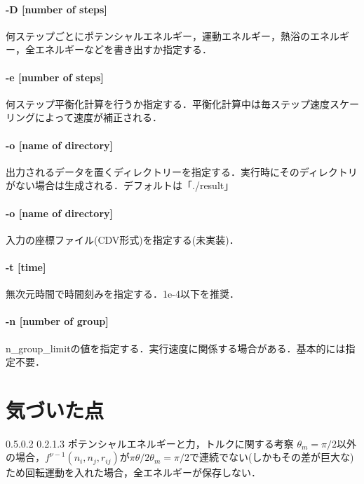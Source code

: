 \documentclass[11pt,a4j,titlepage,oneside,openright]{jsbook}
\makeatletter
\renewcommand{\section}{%
   \@startsection{section}{1}{\z@}%
   {0.5\Cvs \@plus.0\Cdp \@minus.2\Cdp}%
   {0.2\Cvs \@plus.1\Cdp \@minus.3\Cdp}%
   {\reset@font\large\bfseries}}%
\makeatother
\begin{document}
   \subsubsection{-D [number of steps]}
   何ステップごとにポテンシャルエネルギー，運動エネルギー，熱浴のエネルギー，全エネルギーなどを書き出すか指定する．
   \subsubsection{-e [number of steps]}
   何ステップ平衡化計算を行うか指定する．平衡化計算中は毎ステップ速度スケーリングによって速度が補正される．
   \subsubsection{-o [name of directory]}
   出力されるデータを置くディレクトリーを指定する．実行時にそのディレクトリがない場合は生成される．デフォルトは「./result」
   \subsubsection{-o [name of directory]}
   入力の座標ファイル(CDV形式)を指定する(未実装)．
   \subsubsection{-t [time]}
   無次元時間で時間刻みを指定する．1e-4以下を推奨．
   \subsubsection{-n [number of group]}
   n\_group\_limitの値を指定する．実行速度に関係する場合がある．基本的には指定不要．

\chapter{気づいた点}

 \section{ポテンシャルエネルギーと力，トルクに関する考察}
 $\theta_m = \pi/2$以外の場合，$f^{\nu-1}(n_i,n_j,r_{ij})$が$\pi\theta/2\theta_m = \pi/2$で連続でない(しかもその差が巨大な)ため回転運動を入れた場合，全エネルギーが保存しない．
 

\end{document}
